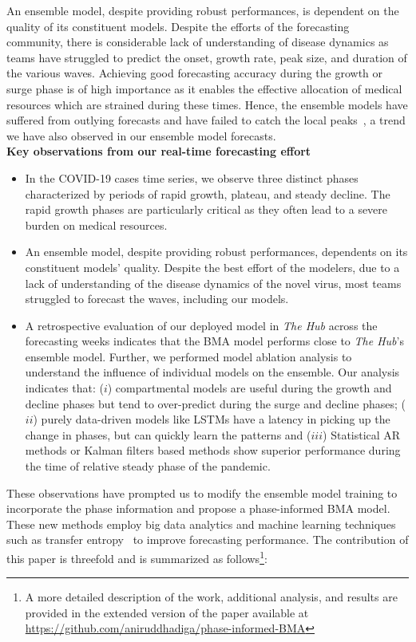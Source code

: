 \documentclass[conference,compsoc]{IEEEtran}
\newcommand{\hub}{\emph{The Hub}}
\begin{document}
 An ensemble model, despite providing robust performances, is dependent on the quality of its constituent models. Despite the efforts of the forecasting community, there is considerable lack of understanding of disease dynamics as teams have struggled to predict the onset, growth rate, peak size, and duration of the various waves. Achieving good forecasting accuracy during the growth or surge phase is of high importance as it enables the effective allocation of medical resources which are strained during these times. Hence, the ensemble models have suffered from outlying forecasts and have failed to catch the local peaks~\cite{ray2021challenges}, a trend we have also observed in our ensemble model forecasts. 
 \\
\textbf{Key observations from our real-time forecasting effort}
\begin{itemize}
    \item In the COVID-19 cases time series, we observe three distinct phases characterized by periods of rapid growth, plateau, and steady decline. The rapid growth phases are particularly critical as they often lead to a severe burden on medical resources.
    \item An ensemble model, despite providing robust performances, dependents on its constituent models' quality. Despite the best effort of the modelers, due to a lack of understanding of the disease dynamics of the novel virus, most teams struggled to forecast the waves, including our models. 
    \item A retrospective evaluation of our deployed model \cite{allmodels} in \hub{} across the forecasting weeks indicates that the BMA model performs close to \hub's ensemble model. Further, we performed model ablation analysis to understand the influence of individual models on the ensemble. Our analysis indicates that: ($i$) compartmental models are useful during the growth and decline phases but tend to over-predict during the surge and decline phases; ($ii$) purely data-driven models like LSTMs have a latency in picking up the change in phases, but can quickly learn the patterns and ($iii$) Statistical AR methods or Kalman filters based methods show superior performance during the time of relative steady phase of the pandemic.
    
\end{itemize}

These observations have prompted us to modify the ensemble model training to incorporate the phase information and propose a phase-informed BMA model. These new methods employ big data analytics and machine learning techniques such as transfer entropy~\cite{schreiber2000measuring} to improve forecasting performance. The contribution of this paper is threefold and is summarized as follows\footnote{A more detailed description of the work, additional analysis, and results are provided in the extended version of the paper available at \url{https://github.com/aniruddhadiga/phase-informed-BMA}}:
\end{document}
